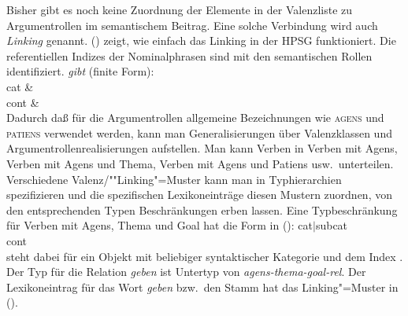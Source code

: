 Bisher gibt es noch keine Zuordnung der Elemente in der Valenzliste zu
Argumentrollen im semantischem Beitrag.
Eine solche Verbindung wird auch \emph{Linking} genannt.
() zeigt, wie einfach das Linking in der HPSG funktioniert.
Die referentiellen Indizes der Nominalphrasen sind mit den semantischen Rollen identifiziert.
\ea
\label{le-geben}
\textit{gibt\/} (finite Form):\\
\ms
{ cat &  \\
  cont &   \\
}
\z
Dadurch daß für die Argumentrollen allgemeine Bezeichnungen wie \textsc{agens} und \textsc{patiens}
verwendet werden, kann man Generalisierungen über Valenzklassen und
Argumentrollenrealisierungen aufstellen. Man kann \zb Verben in Verben mit Agens, Verben mit Agens
und Thema, Verben mit Agens und Patiens usw.\ unterteilen. Verschiedene Valenz/""Linking"=Muster kann man
in Typhierarchien spezifizieren und die spezifischen Lexikoneinträge diesen Mustern zuordnen,
\dash von den entsprechenden Typen Beschränkungen erben lassen. Eine Typbeschränkung für
Verben mit Agens, Thema und Goal hat die Form in ():
\ea
\onems
{ cat$|$subcat  \\[1mm]
  cont   \\
}
\z
[] steht dabei für ein Objekt mit beliebiger syntaktischer Kategorie und dem Index
. 
Der Typ für die Relation \textit{geben\/} ist Untertyp von \textit{agens-thema-goal-rel\/}.
Der Lexikoneintrag für das Wort \emph{geben} bzw.\ den Stamm  hat das Linking"=Muster in ().

